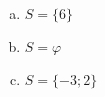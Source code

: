 \begin{resp}
\begin{multicols}{2}
 \begin{enumerate}[a)]
\item $S= \{6 \}$
\item $S= \varphi$
\item $S= \{-3; 2\}$
\end{enumerate}
\end{multicols}
\end{resp}

\construirExer

